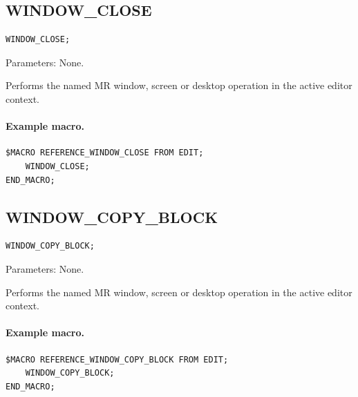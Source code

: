 \documentclass[a4paper,10pt,twoside,openany]{book}
\newenvironment{mrmacextension}{\begin{changebar}}{\end{changebar}}
\begin{document}
\begin{mrmacextension}
\label{prim:procedure-window-close}
\subsection*{WINDOW\_CLOSE}
\begin{verbatim}
WINDOW_CLOSE;
\end{verbatim}
Parameters: None.

Performs the named MR window, screen or desktop operation in the active editor context.

\paragraph{Example macro.}
\begin{verbatim}
$MACRO REFERENCE_WINDOW_CLOSE FROM EDIT;
    WINDOW_CLOSE;
END_MACRO;
\end{verbatim}
\end{mrmacextension}

\begin{mrmacextension}
\label{prim:procedure-window-copy-block}
\subsection*{WINDOW\_COPY\_BLOCK}
\begin{verbatim}
WINDOW_COPY_BLOCK;
\end{verbatim}
Parameters: None.

Performs the named MR window, screen or desktop operation in the active editor context.

\paragraph{Example macro.}
\begin{verbatim}
$MACRO REFERENCE_WINDOW_COPY_BLOCK FROM EDIT;
    WINDOW_COPY_BLOCK;
END_MACRO;
\end{verbatim}
\end{mrmacextension}
\end{document}

